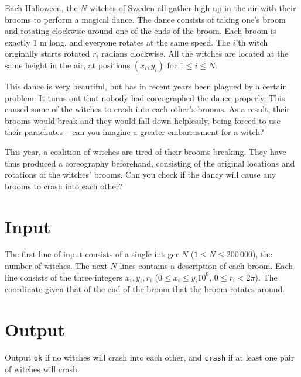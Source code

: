 Each Halloween, the $N$ witches of Sweden all gather high up in the air with their brooms to perform a magical dance.
The dance consists of taking one's broom and rotating clockwise around one of the ends of the broom.
Each broom is exactly $1\text{ m}$ long, and everyone rotates at the same speed.
The $i$'th witch originally starts rotated $r_i\text{ radians}$ clockwise.
All the witches are located at the same height in the air, at positions $(x_i, y_i)$ for $1 \le i \le N$.

This dance is very beautiful, but has in recent years been plagued by a certain problem.
It turns out that nobody had coreographed the dance properly.
This caused some of the witches to crash into each other's brooms.
As a result, their brooms would break and they would fall down helplessly, being forced to use their parachutes -- can you imagine a greater embarrasment for a witch?

This year, a coalition of witches are tired of their brooms breaking.
They have thus produced a coreography beforehand, consisting of the original locations and rotations of the witches' brooms.
Can you check if the dancy will cause any brooms to crash into each other?

\section*{Input}
The first line of input consists of a single integer $N$ ($1 \le N \le 200\,000$), the number of witches.
The next $N$ lines contains a description of each broom.
Each line consists of the three integers $x_i, y_i, r_i$ ($0 \le x_i \le y_i 10^9$, $0 \le r_i < 2\pi$).
The coordinate given that of the end of the broom that the broom rotates around.

\section*{Output}
Output \texttt{ok} if no witches will crash into each other, and \texttt{crash} if at least one pair of witches will crash.
